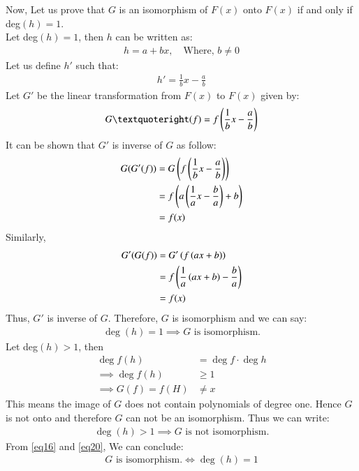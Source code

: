 \documentclass[journal,12pt,twocolumn]{IEEEtran}
\begin{document}
Now, Let us prove that $G$ is an isomorphism of $F(x)$ onto $F(x)$ if and only if deg$(h)=1$. \\
Let deg$(h)=1$, then $h$ can be written as:
\begin{align}
    h=a+bx, \quad \text{Where, }b \ne 0
\end{align}
Let us define $h'$ such that:
\begin{align}
    h'=\frac1bx-\frac ab
\end{align}
Let $G'$ be the linear transformation from $F(x)$ to $F(x)$ given by:
\begin{align}
    G’(f)=f\brak{\frac1bx-\frac ab}
\end{align}
It can be shown that $G'$ is inverse of $G$ as follow:
\begin{align}
    G(G'(f))&=G\left(f\left(\frac1bx-\frac ab\right)\right)\\
    &=f\left(a\left(\frac1ax-\frac ba\right)+b\right)\\
    &=f(x)
\end{align}
Similarly, 
\begin{align}
    G'(G(f))&=G'\left(f\left(ax+b\right)\right)\\
    &=f\left(\frac1a\left(ax+b\right)-\frac ba\right)\\
    &=f(x)
\end{align}
Thus, $G'$ is inverse of $G$. Therefore, $G$ is isomorphism and we can say: 
\begin{align}
    \boxed{\deg(h)=1 \implies \text{$G$ is isomorphism.}} \label{eq16}
\end{align}
Let deg$(h)>1$, then 
\begin{align}
    \deg f(h)&=\deg f\cdot \deg h \\
    \implies \deg f(h)&\geq 1\\
    \implies G(f)=f(H) &\ne x
\end{align}
This means the image of $G$ does not contain polynomials of degree one. Hence $G$ is not onto and therefore $G$ can not be an isomorphism. Thus we can write:
\begin{align}
    \boxed{\deg(h)>1 \implies \text{$G$ is not isomorphism.}} \label{eq20} 
\end{align}
From \eqref{eq16} and \eqref{eq20}, We can conclude:
\begin{align}
    \boxed{\text{$G$ is isomorphism.} \iff \deg(h)=1}  
\end{align}
\end{document}
